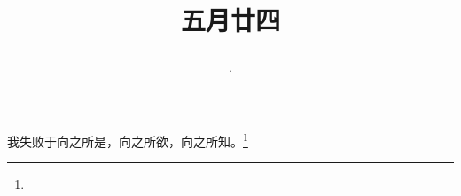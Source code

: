 \title{\date[d=29,m=6,y=2024][year:cn-y,年,month:cn,day:cn,日,·,weekday]·五月廿四 }
我失败于向之所是，向之所欲，向之所知。\footnote{ }

